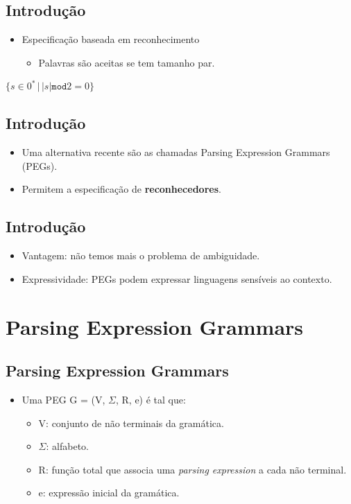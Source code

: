 \documentclass[11pt]{article}
\begin{document}
\subsection*{Introdução}
\label{sec:org502a072}

\begin{itemize}
\item Especificação baseada em reconhecimento
\begin{itemize}
\item Palavras são aceitas se tem tamanho par.
\end{itemize}
\end{itemize}

\(\{s \in 0^{*}\,|\,|s|\mathtt{ mod } 2 = 0\}\)
\subsection*{Introdução}
\label{sec:org66776d4}

\begin{itemize}
\item Uma alternativa recente são as chamadas Parsing Expression Grammars (PEGs).

\item Permitem a especificação de \textbf{reconhecedores}.
\end{itemize}
\subsection*{Introdução}
\label{sec:orgccdf590}

\begin{itemize}
\item Vantagem: não temos mais o problema de ambiguidade.

\item Expressividade: PEGs podem expressar linguagens sensíveis ao contexto.
\end{itemize}
\section*{Parsing Expression Grammars}
\label{sec:orgba4fedc}

\subsection*{Parsing Expression Grammars}
\label{sec:org0e7ad38}

\begin{itemize}
\item Uma PEG G = (V, \(\Sigma\), R, e) é tal que:
\begin{itemize}
\item V: conjunto de não terminais da gramática.
\item \(\Sigma\): alfabeto.
\item R: função total que associa uma \emph{parsing expression} a cada não terminal.
\item e: expressão inicial da gramática.
\end{itemize}
\end{itemize}
\end{document}
